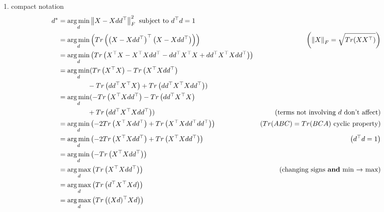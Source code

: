 \begin{enumerate}
\begin{enumerate}
        \item 
        compact notation
        \[
        \begin{aligned}
        d^\ast
        &= \mathop{\arg\min}_d 
            \left\| X - Xdd^\top \right\|_F^2
            \text{ subject to }
            d^\top d = 1 \\
        &= \mathop{\arg\min}_d 
            \left(Tr\left(
                \left(X - Xdd^\top\right)^\top
                \left(X - Xdd^\top\right)
            \right)\right)
            &\left(\left\| X \right\|_F= \sqrt{Tr(XX^\top)}\right) \\
        &= \mathop{\arg\min}_d 
            \left(Tr\left(
                X^\top X - X^\top Xdd^\top - dd^\top X^\top X + dd^\top X^\top Xdd^\top
            \right)\right)
            \\
        &= \mathop{\arg\min}_d 
            (Tr\left(X^\top X\right) - Tr\left(X^\top Xdd^\top\right)\\
            &\text{\hspace{1.5cm}} - Tr\left(dd^\top X^\top X\right) + Tr\left(dd^\top X^\top Xdd^\top\right))
            \\
        &= \mathop{\arg\min}_d 
            (- Tr\left(X^\top Xdd^\top\right) - Tr\left(dd^\top X^\top X\right) \\
            &\text{\hspace{1.5cm}} + Tr\left(dd^\top X^\top Xdd^\top
            \right))
            &\left(\text{terms not involving $d$ don't affect}\right)\\
        &= \mathop{\arg\min}_d 
            \left(- 2Tr\left(X^\top Xdd^\top\right) + Tr\left(X^\top X dd^\top dd^\top
            \right)\right)
            &\left(Tr(ABC)=Tr(BCA) \text{ cyclic property}\right)\\
        &= \mathop{\arg\min}_d 
            \left(- 2Tr\left(X^\top Xdd^\top\right) + Tr\left(X^\top X dd^\top
            \right)\right) 
            & \text{ $\left(d^\top d = 1\right)$}
            \\
        &= \mathop{\arg\min}_d 
            \left(- Tr\left(X^\top Xdd^\top\right)\right)\\
        &= \mathop{\arg\max}_d 
            \left(Tr\left(X^\top Xdd^\top\right)\right) 
            & \text{(changing signs \textbf{and} min $\to$ max)}\\
        &= \mathop{\arg\max}_d
            \left(Tr\left(d^\top X^\top Xd\right)\right)\\
        &= \mathop{\arg\max}_d
            \left(Tr\left((Xd)^\top Xd\right)\right)\\
        \end{aligned}
        \]

        
    \end{enumerate}
\end{enumerate}
